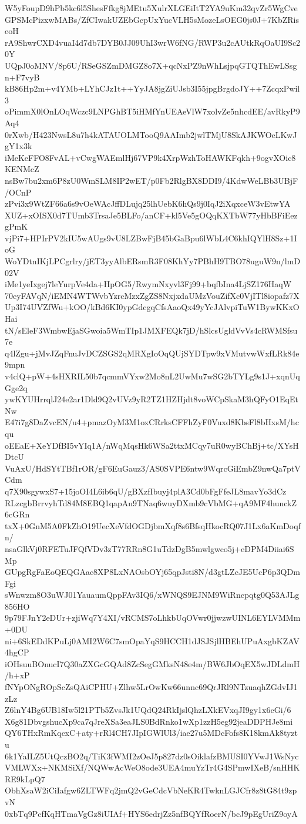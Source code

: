 W5yFoupD9hPb5kc6l5ShesFfkg8jMEtu5XulrXLGEiItT2YA9uKm32qvZr5WgCve
GPSMcPizxwMABs/ZfCIwakUZEbGcpUxYucVLH5sMozeLsOEG0js0J+7KbZRiseoH
rA9ShwrCXD4vuaI4d7db7DYB0JJ09UhI3wrW6fNG/RWP3u2cAUtkRqOaUI9Sc20Y
UQpJ0oMNV/8p6U/RSeGSZmDMGZ8o7X+qcNxPZ9nWhLsjpqGTQThEwLSsgn+F7vyB
kB86Hp2m+v4YMb+LYhCJz1t++YyJA8jgZiUJsb3I55jpgBrgdoJY++7ZcqxPwil3
oPimmX0lOnLOqWczc9LNPGhBT5iHMfYnUEAeVlW7xolvZe5nhcdEE/avRkyP9Aq4
0rXwb/H423NwsL8u7h4kATAUOLMTooQ9AAImb2jwlTMjU8SkAJKWOeLKwJgY1x3k
iMeKeFFO8FvAL+vCwgWAEmlHj67VP9k4XrpWzhToHAWKFqkh+9ogvXOic8KENMcZ
nsBw7bu2xm6P8zU0WmSLM8IP2wET/p0Fb2RlgBX8DDI9/4KdwWeLBb3UBjF/OCnP
zPvi3x9WtZF66a6s9vOeWAcJffDLujq25lhUebK6hQs9j0IqJ2iXqxceW3vEtwYA
XUZ+xOISX0d7TUmb3TrsaJe5BLFo/anCF+kl5Ve5gOQqKXTbW77yHbBFiEezgPmK
vjPi7+HPIrPV2kIU5wAUgs9vU8LZBwFjB45bGaBpu6lWbL4C6khIQYlH8Sz+1IoG
WoYDtnIKjLPCgrlry/jET3yyAlbERsmR3F08KhYy7PBhH9TBO78uguW9n/lmD02V
iMe1yeIxgej7leYurpVe4da+HpOG5/RwymNxyvl3Fj99+bqfbIna4LjSZ176HaqW
70eyFAVqN/iEMN4WTWvbYzrcMzxZgZS8NxjxdaUMzVouZifXc0VjITl8iopafz7X
Up3I74UVZfWu+kOO/kBd6KI0ypGdcgqCfsAaoQx49yYcJAlvpiTuW1BywKKxOHai
tN/sEleF3WmbwEjaSGwoia5WmTIp1JMXFEQk7jD/hSlcsUgldVvVs4cRWMSfsu7e
q4lZgu+jMvJZqFnuJvDCZSGS2qMRXgIoOqQUjSYDTpw9xVMutvwWxfLRk84e9mpn
v4clQ+pW+4sHXRIL50b7qcmmVYxw2Mo8nL2UwMu7wSG2bTYLg9s1J+xqnUqGge2q
ywKYUHrrqlJ24e2ar1Dld9Q2vUVz9yR2TZ1HZHjdt8voWCpSkaM3hQFyO1EqEtNw
E47i7g8DaZvcEN/u4+pmazOyM3M1oxCRrksCFFhZyF0Vuxd8KbsFl8bHxsM/hcqu
oEEaE+XeYDfBI5vYIq1A/nWqMqsHk6WSa2ttxMCqy7uR0wyBChBj+tc/XYsHDtcU
VuAxU/HdSYtTBf1rOR/gF6EuGauz3/AS0SVPE6ntw9WqrcGiEmbZ9nwQa7ptVCdm
q7X90sgywxS7+15joOI4L6ib6qU/gBXzfIbuyj4plA3Cd0bFgFfeJL8mavYo3dCz
RLzcgbBrrvyhTd84M8EBQ1qapAn9TNaq6wuyDXmb9cVbMG+qA9MF4hunckZ6cGRn
txX+0GnM5A0FkZhO19UecXeVfdOGDjbmXqf8s6BfsqHkocRQ07J1Lx6aKmDoqfn/
nsaGlkVj0RFETuJFQfVDv3zT77RRn8G1uTdzDgB5mwlgwco5j+eDPM4Diiai6SMp
GUpgRgFaEoQEQGAac8XP8LxNAOsbOYj65qpJsti8N/d3gtLZcJE5UcP6p3QDmFgi
sWnwzm8O3uWJ01YauaumQppFAv3IQ6/xWNQS9EJNM9WiRncpqtg0Q53AJLg856HO
9p79FJnY2eDUr+zjiWq7Y4XI/vRCMS7oLhkbUqOVwr0jjwzwUINL6EYLVMMm+0DU
ni+6SkEDdKPuLj0AMI2W6C7smOpaYqS9HCCH1dJSJSjlHBEhUPuAxgbKZAV4hgCP
iOHsuuBOnucI7Q30aZXGcGQAd8ZcSegGMksN48e4m/BW6JbOqEX5wJDLdmH/h+xP
fNYpONgROpScZsQAiCPHU+Zlhw5LrOwKw66unnc69QrJRl9NTzuaqhZGdvIJ1zLz
Z6lnY4Bg6UB18Iw5l21PTb5ZvsJk1UQdQ24RkIjslQhzLXkEVxqJI9gy1x6cGi/6
X6g81DbvgshucXp9ca7qJreXSa3eaJLS0BdRnko1wXp1zzH5eg92jeaDDPHJe8mi
QY6THxRmKqcxC+aty+rRl4CH7JIpIGWlUl3/iae27u5MDcFofs8K18kmAk8tyztu
6k1YaILZ5UtQczBO2q/TiK3fWMI2zOeJ5p827dz0sOiklafzBMUSI0YVwJ1WsNyc
VMLWXx+NKMSiXf/NQWwAcWeO8ode3UEA4muYzTr4G4SPmwIXeB/snHHKRE9kLpQ7
ObhXsaW2iCiIafgw6ZLTWFq2jmQ2vGeCdcVbNeKR4TwknLGJCfr8z8tG84t9zpvN
0xbTq9PcfKqHTmaVgGz8iUIAf+HYS6edrjZz5nfBQYfRoerN/bcJ9pEgUriZ9oyA
